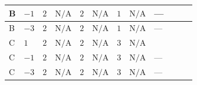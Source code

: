 \documentclass[8pt]{article}
\begin{document}
\begin{landscape}
\begin{longtable}{@{}llcccccc >{\raggedright\arraybackslash}p{0.21\linewidth} >{\raggedright\arraybackslash}p{0.21\linewidth} >{\raggedright\arraybackslash}p{0.21\linewidth}@{}}
\midrule
B & $-1$ & $2$ & $\text{N/A}$ & $2$ & $\text{N/A}$ & $1$ & $\text{N/A}$ & --- & \scriptsize\adjustbox{max width=\linewidth}{$\begin{gathered} -9 {g_2}^2 {\lambda_{HS_1}^{(A)}}\end{gathered}$} & \scriptsize\adjustbox{max width=\linewidth}{$\begin{gathered} +{\lambda_{12}^{(A)}} {\lambda_{HS_2}^{(A)}}\end{gathered}$} \\
\midrule
B & $-3$ & $2$ & $\text{N/A}$ & $2$ & $\text{N/A}$ & $1$ & $\text{N/A}$ & --- & \scriptsize\adjustbox{max width=\linewidth}{$\begin{gathered} -9 {g_2}^2 {\lambda_{HS_1}^{(A)}}\end{gathered}$} & \scriptsize\adjustbox{max width=\linewidth}{$\begin{gathered} +{\lambda_{12}^{(A)}} {\lambda_{HS_2}^{(A)}}\end{gathered}$} \\
\midrule
C & $1$ & $2$ & $\text{N/A}$ & $2$ & $\text{N/A}$ & $3$ & $\text{N/A}$ & \scriptsize\adjustbox{max width=\linewidth}{$\begin{gathered} +{g_1}^2 \left(6 {g_2}^2-3 {\lambda_{HS_1}^{(A)}}\right)\end{gathered}$} & \scriptsize\adjustbox{max width=\linewidth}{$\begin{gathered} -9 {g_2}^2 {\lambda_{HS_1}^{(A)}}\end{gathered}$} & \scriptsize\adjustbox{max width=\linewidth}{$\begin{gathered} +{\lambda_{12}^{(A)}} {\lambda_{HS_2}^{(A)}}\end{gathered}$} \\
\midrule
C & $-1$ & $2$ & $\text{N/A}$ & $2$ & $\text{N/A}$ & $3$ & $\text{N/A}$ & --- & \scriptsize\adjustbox{max width=\linewidth}{$\begin{gathered} -9 {g_2}^2 {\lambda_{HS_1}^{(A)}}\end{gathered}$} & \scriptsize\adjustbox{max width=\linewidth}{$\begin{gathered} +{\lambda_{12}^{(A)}} {\lambda_{HS_2}^{(A)}}\end{gathered}$} \\
\midrule
C & $-3$ & $2$ & $\text{N/A}$ & $2$ & $\text{N/A}$ & $3$ & $\text{N/A}$ & --- & \scriptsize\adjustbox{max width=\linewidth}{$\begin{gathered} -9 {g_2}^2 {\lambda_{HS_1}^{(A)}}\end{gathered}$} & \scriptsize\adjustbox{max width=\linewidth}{$\begin{gathered} +{\lambda_{12}^{(A)}} {\lambda_{HS_2}^{(A)}}\end{gathered}$} \\

\end{longtable}
\end{landscape}
\end{document}
